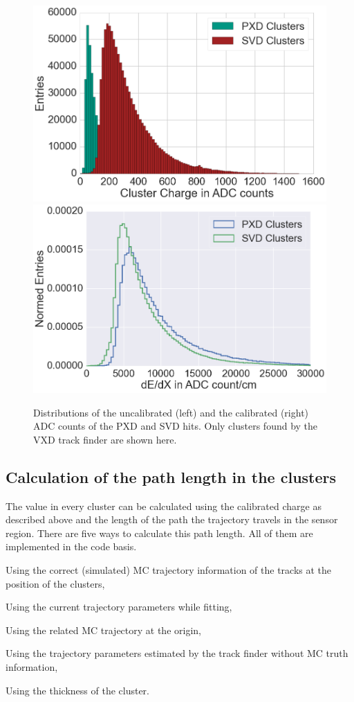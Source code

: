 \begin{figure}
  \centering
 \includegraphics[width=0.48\linewidth]{figures/vxd/dEdXUncalibrated.png}
 \includegraphics[width=0.48\linewidth]{figures/vxd/dEdXCalibrated.png}
 \caption{Distributions of the uncalibrated (left) and the calibrated (right) ADC counts of the PXD and SVD hits. Only clusters found by the VXD track finder are shown here.}
 \label{fig-adc-count}
\end{figure}

\subsection{Calculation of the path length in the clusters}
The \dedx value in every cluster can be calculated using the calibrated charge as described above and the length of the path the trajectory travels in the sensor region. There are five ways to calculate this path length. All of them are implemented in the code basis.
\begin{zlist}
 \item Using the correct (simulated) MC trajectory information of the tracks at the position of the clusters, \label{list-mc}
 \item Using the current trajectory parameters while fitting,
 \item Using the related MC trajectory at the origin,
 \item Using the trajectory parameters estimated by the track finder without MC truth information,
 \item Using the thickness of the cluster.
\end{zlist}

